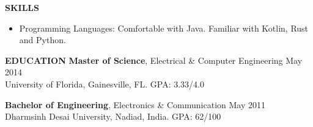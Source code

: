 \documentclass[10pt, letterpaper]{article}
\begin{document}
\textbf{SKILLS}
\smallskip 
\begin{itemize}
\item Programming Languages: Comfortable with Java. Familiar with Kotlin, Rust and Python.
\end{itemize} 

\textbf{EDUCATION}
\smallskip
\newline
{\bf Master of Science}, Electrical \& Computer Engineering \hfill May 2014\\
University of Florida, Gainesville, FL. \hfill GPA: 3.33/4.0

{\bf Bachelor of Engineering}, Electronics \& Communication \hfill May 2011\\
Dharmsinh Desai University, Nadiad, India. \hfill GPA: 62/100
\end{document}
